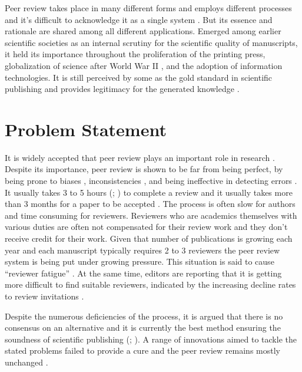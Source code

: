 Peer review takes place in many different forms and employs different processes and it’s difficult to acknowledge it as a single system \parencite[2]{HorbachS.P.J.M..2017}. But its essence and rationale are shared among all different applications. Emerged among earlier scientific societies as an internal scrutiny for the scientific quality of manuscripts, it held its importance throughout the proliferation of the printing press, globalization of science after World War II \parencite{Fyfe.2017}, and the adoption of information technologies. It is still perceived by some as the gold standard in scientific publishing \parencite{Mayden.2012} and provides legitimacy for the generated knowledge \parencite{Tennant.2020c}.

\section{Problem Statement} \label{sec:problem-statement}

It is widely accepted that peer review plays an important role in research \parencite{Publons.2018, Taylor&Francis.2015, Ware.2008, Zuckerman.1971}. Despite its importance, peer review is shown to be far from being perfect, by being prone to biases \parencite{Lee.2013, Mahoney.1977}, inconsistencies \parencite{Peters.1982, Rothwell.2000}, and being ineffective in detecting errors \parencite{Schroter.2004}. It usually takes 3 to 5 hours (\cite[146]{Mulligan.2013}; \cite[42]{Ware.2008}) to complete a review and it usually takes more than 3 months for a paper to be accepted \parencite[51]{Ware.2008}. The process is often slow for authors and time consuming for reviewers. Reviewers who are academics themselves with various duties are often not compensated for their review work and they don’t receive credit for their work. Given that number of publications is growing each year \parencite{Bornmann.2015} and each manuscript typically requires 2 to 3 reviewers the peer review system is being put under growing pressure. This situation is said to cause “reviewer fatigue” \parencite{Breuning.2015}. At the same time, editors are reporting that it is getting more difficult to find suitable reviewers, indicated by the increasing decline rates to review invitations \parencite{Baveye.2011, Fox.2017}. 

Despite the numerous deficiencies of the process, it is argued that there is no consensus on an alternative \parencite{Smith.2006, Young.2003} and it is currently the best method ensuring the soundness of scientific publishing (\cite[5201]{Grainger.2007}; \cite[2]{HorbachS.P.J.M..2017}). A range of innovations aimed to tackle the stated problems failed to provide a cure and the peer review remains mostly unchanged \parencite{Tennant.2017}. 


